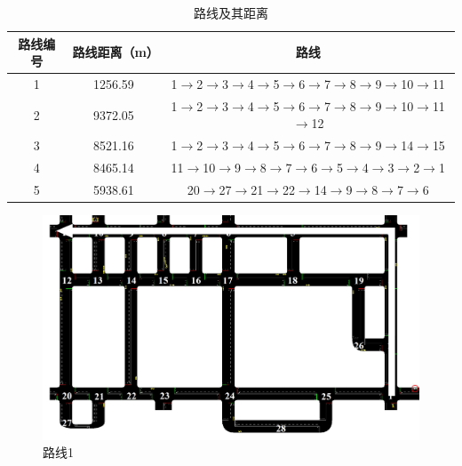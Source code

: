 \begin{table}[H]
	\centering
	\caption{路线及其距离}
	\label{table:route}
	\begin{tabular}{|c|c|c|}
			\hline
			路线编号 & 路线距离（m） & 路线 \\
			\hline
			1 & 1256.59 & 1$\rightarrow$2$\rightarrow$3$\rightarrow$4$\rightarrow$5$\rightarrow$6$\rightarrow$7$\rightarrow$8$\rightarrow$9$\rightarrow$10$\rightarrow$11                \\ \hline
			2 & 9372.05 & 1$\rightarrow$2$\rightarrow$3$\rightarrow$4$\rightarrow$5$\rightarrow$6$\rightarrow$7$\rightarrow$8$\rightarrow$9$\rightarrow$10$\rightarrow$11$\rightarrow$12 \\ \hline
			3 & 8521.16 & 1$\rightarrow$2$\rightarrow$3$\rightarrow$4$\rightarrow$5$\rightarrow$6$\rightarrow$7$\rightarrow$8$\rightarrow$9$\rightarrow$14$\rightarrow$15                \\ \hline
			4 & 8465.14 & 11$\rightarrow$10$\rightarrow$9$\rightarrow$8$\rightarrow$7$\rightarrow$6$\rightarrow$5$\rightarrow$4$\rightarrow$3$\rightarrow$2$\rightarrow$1                \\ \hline
			5 & 5938.61 & 20$\rightarrow$27$\rightarrow$21$\rightarrow$22$\rightarrow$14$\rightarrow$9$\rightarrow$8$\rightarrow$7$\rightarrow$6 \\ \hline
	\end{tabular}
\end{table}

\begin{figure}[H]
	\centering
	\includegraphics[width=\linewidth]{figures/route1.jpg}
	\caption{路线1}
	\label{fig:route1}
\end{figure}

